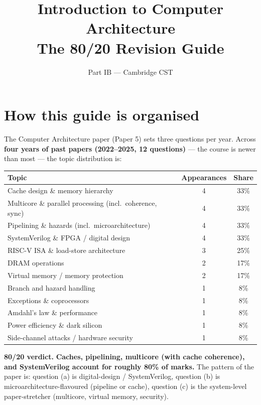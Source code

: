 \documentclass[11pt,a4paper]{article}
\title{\vspace{-1.5cm}\textbf{Introduction to Computer Architecture} \\[2pt] \large The 80/20 Revision Guide}
\author{\small Part IB --- Cambridge CST}
\date{}
\begin{document}
\maketitle
\vspace{-0.8cm}

\section*{How this guide is organised}

The Computer Architecture paper (Paper 5) sets three questions per year. Across \textbf{four years of past papers (2022--2025, 12 questions)} --- the course is newer than most --- the topic distribution is:

\begin{center}
\begin{tabular}{lcc}
\hline
\textbf{Topic} & \textbf{Appearances} & \textbf{Share} \\
\hline
Cache design \& memory hierarchy        & 4 & 33\% \\
Multicore \& parallel processing (incl.\ coherence, sync) & 4 & 33\% \\
Pipelining \& hazards (incl.\ microarchitecture) & 4 & 33\% \\
SystemVerilog \& FPGA / digital design   & 4 & 33\% \\
RISC-V ISA \& load-store architecture    & 3 & 25\% \\
DRAM operations                          & 2 & 17\% \\
Virtual memory / memory protection       & 2 & 17\% \\
Branch and hazard handling               & 1 &  8\% \\
Exceptions \& coprocessors               & 1 &  8\% \\
Amdahl's law \& performance              & 1 &  8\% \\
Power efficiency \& dark silicon         & 1 &  8\% \\
Side-channel attacks / hardware security & 1 &  8\% \\
\hline
\end{tabular}
\end{center}

\textbf{80/20 verdict.} \textbf{Caches, pipelining, multicore (with cache coherence), and SystemVerilog account for roughly 80\% of marks.} The pattern of the paper is: question (a) is digital-design / SystemVerilog, question (b) is microarchitecture-flavoured (pipeline or cache), question (c) is the system-level paper-stretcher (multicore, virtual memory, security).
\end{document}

